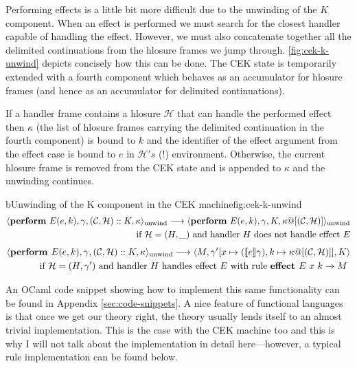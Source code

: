 \documentclass[class=article, crop=false]{standalone}
\begin{document}
Performing effects is a little bit more difficult due to the unwinding of the
$K$ component. When an effect is performed we must search for the closest
handler capable of handling the effect. However, we must also concatenate
together all the delimited continuations from the hlosure frames we jump
through. \autoref{fig:cek-k-unwind} depicts concisely how this can be done. The
CEK state is temporarily extended with a fourth component which behaves as an
accumulator for hlosure frames (and hence as an accumulator for delimited
continuations).

If a handler frame contains a hlosure $\mathcal{H}$ that can handle the
performed effect then $\kappa$ (the list of hlosure frames carrying the
delimited continuation in the fourth component) is bound to $k$ and the
identifier of the effect argument from the effect case is bound to $e$ in
$\mathcal{H}'s$ (!) environment. Otherwise, the current hlosure frame is
removed from the CEK state and is appended to $\kappa$ and the unwinding
continues.

\begin{myfigure}[.95]{b}{Unwinding of the K component in the CEK machine}{fig:cek-k-unwind}
    \begin{align*}
        \cek{ \effPerform E(e,k), \gamma, (\konts, \hlosure) :: K, \kappa}_\text{unwind} \longrightarrow
        \cek{ \effPerform E(e,k), \gamma, K, \kappa@[(\konts, \hlosure)] }_\text{unwind} \\
        \text{ if $\hlosure = (H, \_)$ and handler $H$ does not handle effect $E$}
        \end{align*}
        \begin{align*}
        \langle  \textbf{perform } E(e,k), \gamma, (\mathcal{C}, \mathcal{H}) :: K, \kappa \rangle_\text{unwind} \longrightarrow
        \langle  M, \gamma' [x \mapsto (\llbracket e \rrbracket\gamma), k \mapsto \kappa @ [(\mathcal{C}, \mathcal{H})]], K \rangle \\
        \text{ if $\mathcal{H} = (H, \gamma')$ and handler $H$ handles effect $E$ with rule $\textbf{effect } E\ x \ k \to M$ }
        \end{align*}
\end{myfigure}

An OCaml code snippet showing how to implement this same functionality can be
found in Appendix \autoref{sec:code-snippets}. A nice feature of functional
languages is that once we get our theory right, the theory usually lends
itself to an almost trivial implementation. This is the case with the CEK
machine too and this is why I will not talk about the implementation in
detail here---however, a typical rule implementation can be found below.
\end{document}
